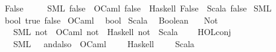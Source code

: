 \begin{isabellebody}
{\isacharbar}{\kern0pt}\ \ False\ {\isasymrightharpoonup}\isanewline
\ \ \ \ {\isacharparenleft}{\kern0pt}SML{\isacharparenright}{\kern0pt}\ {\isachardoublequoteopen}false{\isachardoublequoteclose}\ \ {\isacharparenleft}{\kern0pt}OCaml{\isacharparenright}{\kern0pt}\ {\isachardoublequoteopen}false{\isachardoublequoteclose}\ \ {\isacharparenleft}{\kern0pt}Haskell{\isacharparenright}{\kern0pt}\ {\isachardoublequoteopen}False{\isachardoublequoteclose}\ \ {\isacharparenleft}{\kern0pt}Scala{\isacharparenright}{\kern0pt}\ {\isachardoublequoteopen}false{\isachardoublequoteclose}\isanewline
\isanewline
{}\isamarkupfalse%
\ SML\isanewline
\ \ bool\ true\ false\isanewline
\isanewline
{}\isamarkupfalse%
\ OCaml\isanewline
\ \ bool\isanewline
\isanewline
{}\isamarkupfalse%
\ Scala\isanewline
\ \ Boolean\isanewline
\isanewline
{}\isamarkupfalse%
\isanewline
\ \ \ Not\ {\isasymrightharpoonup}\isanewline
\ \ \ \ {\isacharparenleft}{\kern0pt}SML{\isacharparenright}{\kern0pt}\ {\isachardoublequoteopen}not{\isachardoublequoteclose}\ \ {\isacharparenleft}{\kern0pt}OCaml{\isacharparenright}{\kern0pt}\ {\isachardoublequoteopen}not{\isachardoublequoteclose}\ \ {\isacharparenleft}{\kern0pt}Haskell{\isacharparenright}{\kern0pt}\ {\isachardoublequoteopen}not{\isachardoublequoteclose}\ \ {\isacharparenleft}{\kern0pt}Scala{\isacharparenright}{\kern0pt}\ {\isachardoublequoteopen}{\isacharprime}{\kern0pt}{\isacharbang}{\kern0pt}\ {\isacharunderscore}{\kern0pt}{\isachardoublequoteclose}\isanewline
{\isacharbar}{\kern0pt}\ \ HOL{\isachardot}{\kern0pt}conj\ {\isasymrightharpoonup}\isanewline
\ \ \ \ {\isacharparenleft}{\kern0pt}SML{\isacharparenright}{\kern0pt}\ \ {}\ {\isachardoublequoteopen}andalso{\isachardoublequoteclose}\ \ {\isacharparenleft}{\kern0pt}OCaml{\isacharparenright}{\kern0pt}\ \ {}\ {\isachardoublequoteopen}{\isacharampersand}{\kern0pt}{\isacharampersand}{\kern0pt}{\isachardoublequoteclose}\ \ {\isacharparenleft}{\kern0pt}Haskell{\isacharparenright}{\kern0pt}\ \ {}\ {\isachardoublequoteopen}{\isacharampersand}{\kern0pt}{\isacharampersand}{\kern0pt}{\isachardoublequoteclose}\ \ {\isacharparenleft}{\kern0pt}Scala{\isacharparenright}{\kern0pt}\ \ {}\ {\isachardoublequoteopen}{\isacharampersand}{\kern0pt}{\isacharampersand}{\kern0pt}{\isachardoublequoteclose}\isanewline

\end{isabellebody}
